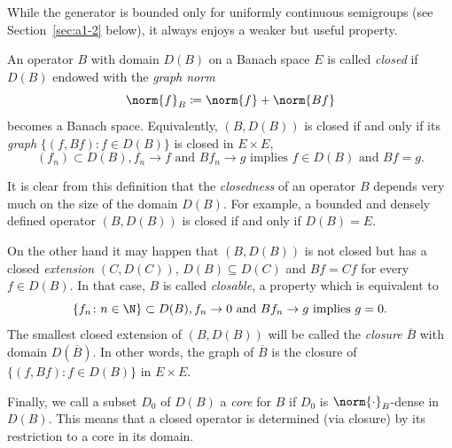 While the generator is bounded only for uniformly continuous semigroups (see Section~\ref{sec:a1-2} below), it always enjoys a weaker but useful property.
\begin{definition}\label{def:a1-1.8}
An operator $B$ with domain $D(B)$ on a Banach space $E$ is called \emph{closed} if\/ $D(B)$ endowed with the \emph{graph norm}
\begin{equation*}\label{eq:a1-1.8}
	\norm{f}_{B} \coloneqq \norm{f} + \norm{Bf}
\end{equation*} 
becomes a Banach space.
Equivalently, $(B,D(B))$ is closed if and only if its \emph{graph} $\{(f,Bf) \colon f \in D(B)\}$ is closed in $E \times E$, \ie
\[
    (f_{n}) \subset D(B), f_{n} \to f \text{ and } Bf_{n} \to g \text{ implies } f \in D(B) \text{ and } Bf = g.
\]
\end{definition}
It is clear from this definition that the \emph{closedness} of an operator $B$ depends very much on the size of the domain $D(B)$.
For example, a bounded and densely defined operator $(B,D(B))$ is closed if and only if\/ $D(B) = E$.

On the other hand it may happen that $(B,D(B))$ is not closed but has a closed \emph{extension} $(C,D(C))$, \ie  $ D(B) \subseteq D(C)$ and $Bf = Cf $ for every $f \in D(B)$.
In that case, $B$ is called \emph{closable}, a property which is equivalent to
\[
    \{f_{n} \colon n \in \N \} \subset D(B), f_{n} \to 0 \text{ and } Bf_{n} \to g \text{ implies } g = 0.
\]
The smallest closed extension of\/ $(B,D(B))$ will be called the \emph{closure} $\overline{B}$ with domain $D(\overline{B})$.
In other words, the graph of\/ $\overline{B}$ is the closure of\/ $\{(f,Bf) \colon f \in D(B)\}$ in $E \times E$.

Finally, we call a subset $D_{0}$ of\/ $D(B)$ a \emph{core} for $B$ if\/ $D_{0}$ is $\norm{\cdot}_{B}$-dense in $D(B)$.
This means that a closed operator is determined (via closure) by its restriction to a core in its domain.


